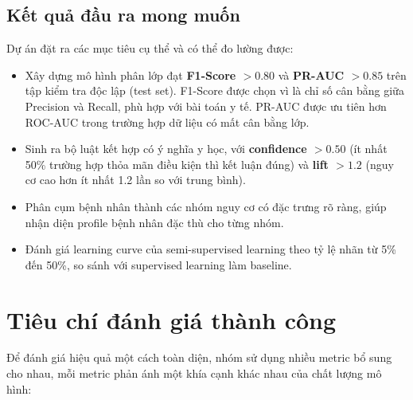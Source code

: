 \subsection{Kết quả đầu ra mong muốn}

Dự án đặt ra các mục tiêu cụ thể và có thể đo lường được:
\begin{itemize}
    \item Xây dựng mô hình phân lớp đạt \textbf{F1-Score $> 0.80$} và \textbf{PR-AUC $> 0.85$} trên tập kiểm tra độc lập (test set). F1-Score được chọn vì là chỉ số cân bằng giữa Precision và Recall, phù hợp với bài toán y tế. PR-AUC được ưu tiên hơn ROC-AUC trong trường hợp dữ liệu có mất cân bằng lớp.
    \item Sinh ra bộ luật kết hợp có ý nghĩa y học, với \textbf{confidence $> 0.50$} (ít nhất 50\% trường hợp thỏa mãn điều kiện thì kết luận đúng) và \textbf{lift $> 1.2$} (nguy cơ cao hơn ít nhất 1.2 lần so với trung bình).
    \item Phân cụm bệnh nhân thành các nhóm nguy cơ có đặc trưng rõ ràng, giúp nhận diện profile bệnh nhân đặc thù cho từng nhóm.
    \item Đánh giá learning curve của semi-supervised learning theo tỷ lệ nhãn từ 5\% đến 50\%, so sánh với supervised learning làm baseline.
\end{itemize}

\section{Tiêu chí đánh giá thành công}

Để đánh giá hiệu quả một cách toàn diện, nhóm sử dụng nhiều metric bổ sung cho nhau, mỗi metric phản ánh một khía cạnh khác nhau của chất lượng mô hình:

